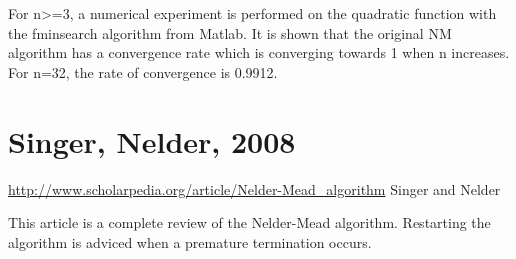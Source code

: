 For n>=3, a numerical experiment is performed on the quadratic function 
with the fminsearch algorithm from Matlab. It is shown that the original 
NM algorithm has a convergence rate which is converging towards 1 when n 
increases. For n=32, the rate of convergence is 0.9912.

\section{Singer, Nelder, 2008}

\url{http://www.scholarpedia.org/article/Nelder-Mead_algorithm}
Singer and Nelder

This article is a complete review of the Nelder-Mead algorithm.
Restarting the algorithm is adviced when a premature termination occurs.


